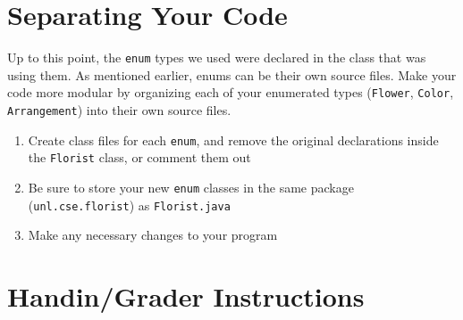 \documentclass[12pt]{scrartcl}
\begin{document}
%
	
\section{Separating Your Code}

Up to this point, the \texttt{enum} types we used were declared in the 
class that was using them.  As mentioned earlier, enums can be their own source 
files.  Make your code more modular by organizing each of your enumerated types 
(\texttt{Flower}, \texttt{Color}, \texttt{Arrangement}) 
into their own source files.
\begin{enumerate}
  \item Create class files for each \texttt{enum}, and remove the original 
	declarations inside the \texttt{Florist} class, or comment them out
  \item Be sure to store your new \texttt{enum} classes in the same package 
	(\texttt{unl.cse.florist}) as \texttt{Florist.java}
  \item Make any necessary changes to your program
\end{enumerate}

\section{Handin/Grader Instructions}
\end{document}

